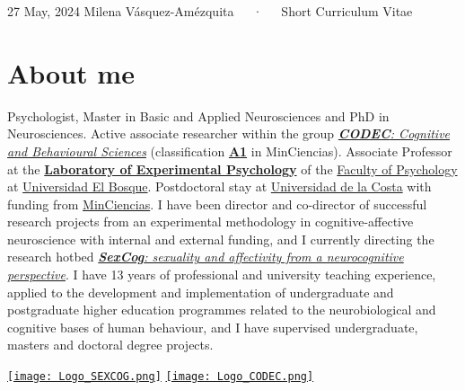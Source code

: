 \documentclass[11pt,a4paper,]{awesome-cv}
\begin{document}
\makecvheader

\makecvfooter
  {27 May, 2024}
    {Milena Vásquez-Amézquita~~~·~~~Short Curriculum Vitae}
  {\thepage}





\hypertarget{about-me}{%
\section{About me}\label{about-me}}

\begin{minipage}[c]{0.85\linewidth}
Psychologist, Master in Basic and Applied Neurosciences and PhD in Neurosciences. Active associate researcher within the group \href{https://investigaciones.unbosque.edu.co/codec}{\textit{\textbf{CODEC}: Cognitive and Behavioural Sciences}} (classification \href{https://scienti.minciencias.gov.co/gruplac/jsp/visualiza/visualizagr.jsp?nro=00000000001446}{\textbf{A1}} in MinCiencias). Associate Professor at the \href{https://grupo-codec.netlify.app/labpsiexp/}{\textbf{Laboratory of Experimental Psychology}} of the \href{https://www.uelbosque.edu.co/psicologia}{Faculty of Psychology} at \href{https://www.uelbosque.edu.co/}{Universidad El Bosque}. Postdoctoral stay at \href{https://www.cuc.edu.co/}{Universidad de la Costa} with funding from \href{https://minciencias.gov.co/}{MinCiencias}. I have been director and co-director of successful research projects from an experimental methodology in cognitive-affective neuroscience with internal and external funding, and I currently directing the research hotbed \href{https://grupo-codec.netlify.app/sexcog/}{\textit{\textbf{SexCog}: sexuality and affectivity from a neurocognitive perspective}}. I have 13 years of professional and university teaching experience, applied to the development and implementation of undergraduate and postgraduate higher education programmes related to the neurobiological and cognitive bases of human behaviour, and I have supervised undergraduate, masters and doctoral degree projects.
\end{minipage} \begin{minipage}[c]{0.15\linewidth}
\begin{flushright} 
\hfill \href{https://grupo-codec.netlify.app/sexcog/}{\texttt{[image: Logo\_SEXCOG.png]}} \newline \href{https://investigaciones.unbosque.edu.co/codec}{\texttt{[image: Logo\_CODEC.png]}}
\end{flushright}
\end{minipage}
\end{document}
